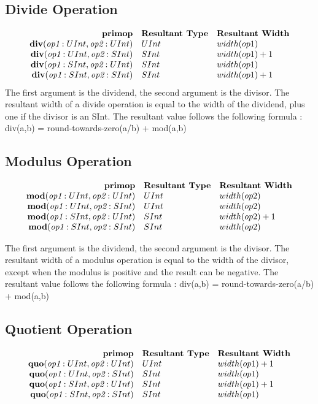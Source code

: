 \documentclass[12pt]{article}
\begin{document}
\subsection{Divide Operation}
\[
\begin{array}{rll}
\text{\bf primop} & \text{\bf Resultant Type} & \text{\bf Resultant Width} \\
\text{\bf div}(\text{\em op1}:UInt, \text{\em op2}:UInt) &   UInt & width(op1)     \\
\text{\bf div}(\text{\em op1}:UInt, \text{\em op2}:SInt) &   SInt & width(op1) + 1  \\
\text{\bf div}(\text{\em op1}:SInt, \text{\em op2}:UInt) &   SInt & width(op1)     \\
\text{\bf div}(\text{\em op1}:SInt, \text{\em op2}:SInt) &   SInt & width(op1) + 1  \\
\end{array}
\]
The first argument is the dividend, the second argument is the divisor.
The resultant width of a divide operation is equal to the width of the dividend, plus one if the divisor is an SInt.
The resultant value follows the following formula : div(a,b) = round-towards-zero(a/b) + mod(a,b)

\subsection{Modulus Operation}
\[
\begin{array}{rll}
\text{\bf primop} & \text{\bf Resultant Type} & \text{\bf Resultant Width} \\
\text{\bf mod}(\text{\em op1}:UInt, \text{\em op2}:UInt) &   UInt & width(op2)     \\
\text{\bf mod}(\text{\em op1}:UInt, \text{\em op2}:SInt) &   UInt & width(op2)     \\
\text{\bf mod}(\text{\em op1}:SInt, \text{\em op2}:UInt) &   SInt & width(op2) + 1 \\
\text{\bf mod}(\text{\em op1}:SInt, \text{\em op2}:SInt) &   SInt & width(op2)     \\
\end{array}
\]

The first argument is the dividend, the second argument is the divisor.
The resultant width of a modulus operation is equal to the width of the divisor, except when the modulus is positive and the result can be negative.
The resultant value follows the following formula : div(a,b) = round-towards-zero(a/b) + mod(a,b)

\subsection{Quotient Operation}
\[
\begin{array}{rll}
\text{\bf primop} & \text{\bf Resultant Type} & \text{\bf Resultant Width} \\
\text{\bf quo}(\text{\em op1}:UInt, \text{\em op2}:UInt) &   UInt & width(op1) + 1 \\
\text{\bf quo}(\text{\em op1}:UInt, \text{\em op2}:SInt) &   SInt & width(op1)     \\
\text{\bf quo}(\text{\em op1}:SInt, \text{\em op2}:UInt) &   SInt & width(op1) + 1 \\
\text{\bf quo}(\text{\em op1}:SInt, \text{\em op2}:SInt) &   SInt & width(op1)     \\
\end{array}
\]
\end{document}
